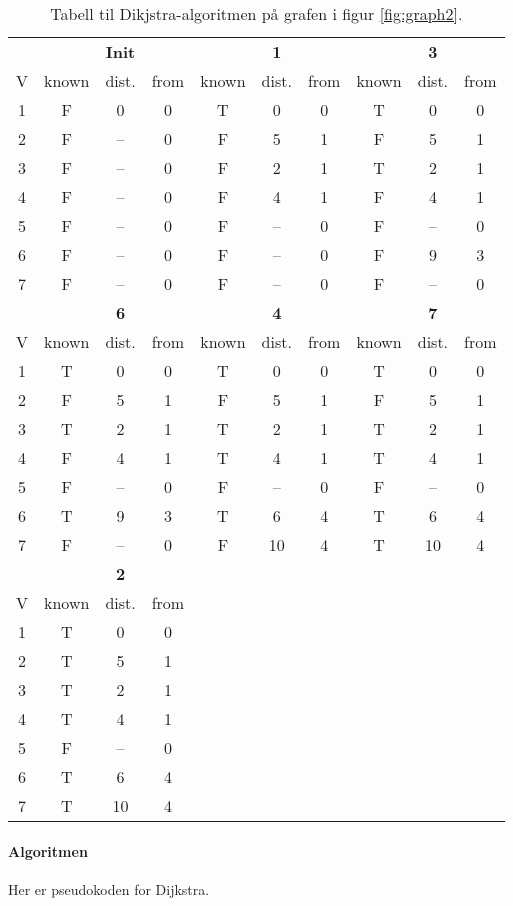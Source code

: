 \documentclass[11pt,a4paper]{article}
\theoremstyle{def}
\begin{document}
\begin{table}
\centering
\begin{tabular}{c|ccc|ccc|ccc}
&&\textbf{Init}&&&\textbf{1}&&&\textbf{3}\\
V & known & dist. & from&known&dist.&from&known&dist.&from\\
\hline
1 & F & 0 & 0&T&0&0&T&0&0\\
2 & F & -- & 0&F&5&1&F&5&1\\
3 & F & -- & 0&F&2&1&T&2&1\\
4 & F & -- & 0&F&4&1&F&4&1\\
5 & F & -- & 0&F&--&0&F&--&0\\
6 & F & -- & 0&F&--&0&F&9&3\\
7 & F & -- & 0&F&--&0&F&--&0\\
\hline
\hline
&&\textbf{6}&&&\textbf{4}&&&\textbf{7}\\
V & known & dist. & from&known&dist.&from&known&dist.&from\\
\hline
1&T&0&0&T&0&0&T&0&0\\
2&F&5&1&F&5&1&F&5&1\\
3&T&2&1&T&2&1&T&2&1\\
4&F&4&1&T&4&1&T&4&1\\
5&F&--&0&F&--&0&F&--&0\\
6&T&9&3&T&6&4&T&6&4\\
7&F&--&0&F&10&4&T&10&4\\
\hline
\hline
&&\textbf{2}&\\
V & known & dist. & from\\
\cline{1-4}
1&T&0&0\\
2&T&5&1\\
3&T&2&1\\
4&T&4&1\\
5&F&--&0\\
6&T&6&4\\
7&T&10&4\\
\end{tabular}
\label{tab:dijkstra}
\caption{Tabell til Dikjstra-algoritmen på grafen i figur \ref{fig:graph2}.}
\end{table}


\paragraph{Algoritmen} Her er pseudokoden for Dijkstra.
\end{document}
